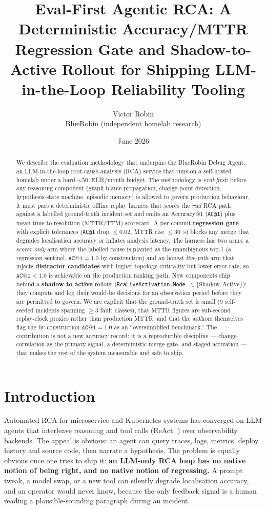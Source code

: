 \documentclass[11pt]{article}
\title{Eval-First Agentic RCA: A Deterministic Accuracy/MTTR Regression Gate and
Shadow-to-Active Rollout for Shipping LLM-in-the-Loop Reliability Tooling}
\author{Victor Robin\\ BlueRobin (independent homelab research)}
\date{June 2026}
\makeatletter
\newcommand{\acone}{\texttt{AC@1}}
\newcommand{\code}[1]{\texttt{#1}}
\makeatother
\begin{document}
\maketitle

\begin{abstract}
We describe the evaluation methodology that underpins the BlueRobin Debug Agent, an
LLM-in-the-loop root-cause-analysis (RCA) service that runs on a self-hosted homelab under
a hard ${\sim}50$~EUR/month budget. The methodology is \emph{eval-first}: before any
reasoning component (graph blame-propagation, change-point detection, hypothesis-state
machine, episodic memory) is allowed to govern production behaviour, it must pass a
deterministic offline replay harness that scores the \emph{real} RCA path against a labelled
ground-truth incident set and emits an Accuracy@1 (\acone{}) plus
mean-time-to-resolution (MTTR/TTM) scorecard. A per-commit \textbf{regression gate} with
explicit tolerances (\acone{} drop $\le 0.02$, MTTR rise $\le 30$~s) blocks any merge that
degrades localisation accuracy or inflates analysis latency. The harness has two arms: a
\emph{scorer-only} arm where the labelled cause is planted as the unambiguous top-1 (a
regression sentinel, $\acone{} = 1.0$ by construction) and an honest \emph{live-path} arm
that injects \textbf{distractor candidates} with higher topology criticality but lower
error-rate, so $\acone{} < 1.0$ is achievable on the production ranking path. New components
ship behind a \textbf{shadow-to-active} rollout (\code{RcaLiveActivation.Mode}~$\in
\{\text{Shadow}, \text{Active}\}$): they compute and log their would-be decisions for an
observation period before they are permitted to govern. We are explicit that the
ground-truth set is small (9 self-seeded incidents spanning $\ge 3$ fault classes), that
MTTR figures are sub-second replay-clock proxies rather than production MTTR, and that the
authors themselves flag the by-construction $\acone{} = 1.0$ as an ``oversimplified
benchmark.'' The contribution is not a new accuracy record; it is a reproducible discipline
--- change-correlation as the primary signal, a deterministic merge gate, and staged
activation --- that makes the rest of the system measurable and safe to ship.
\end{abstract}

\section{Introduction}

Automated RCA for microservice and Kubernetes systems has converged on LLM agents that
interleave reasoning and tool calls (ReAct; \citealp{yao2022react}) over observability
backends. The appeal is obvious: an agent can query traces, logs, metrics, deploy history
and source code, then narrate a hypothesis. The problem is equally obvious once one tries
to ship it: \textbf{an LLM-only RCA loop has no native notion of being right, and no native
notion of regressing.} A prompt tweak, a model swap, or a new tool can silently degrade
localisation accuracy, and an operator would never know, because the only feedback signal
is a human reading a plausible-sounding paragraph during an incident.
\end{document}

